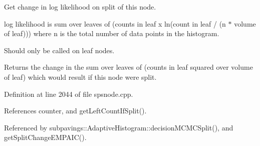 \-Get change in log likelihood on split of this node. 

log likelihood is sum over leaves of (counts in leaf x ln(count in leaf / (n $\ast$ volume of leaf))) where n is the total number of data points in the histogram.

\-Should only be called on leaf nodes.

\begin{DoxyReturn}{\-Returns}
the change in the sum over leaves of (counts in leaf squared over volume of leaf) which would result if this node were split. 
\end{DoxyReturn}


\-Definition at line 2044 of file spsnode.\-cpp.



\-References counter, and get\-Left\-Count\-If\-Split().



\-Referenced by subpavings\-::\-Adaptive\-Histogram\-::decision\-M\-C\-M\-C\-Split(), and get\-Split\-Change\-E\-M\-P\-A\-I\-C().


